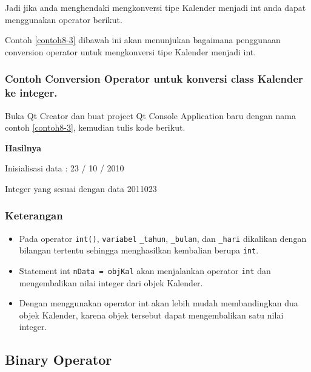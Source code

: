 

Jadi jika anda menghendaki mengkonversi tipe Kalender menjadi int anda
dapat menggunakan operator berikut.



Contoh \ref{contoh8-3} dibawah ini akan menunjukan bagaimana penggunaan conversion
operator untuk mengkonversi tipe Kalender menjadi int.

\subsubsection*{Contoh Conversion Operator untuk konversi class Kalender ke integer.}

Buka Qt Creator dan buat project Qt Console Application baru dengan nama
contoh \ref{contoh8-3}, kemudian tulis kode berikut.





\textbf{Hasilnya}
\begin{lcverbatim}
Inisialisasi data :
23 / 10 / 2010

Integer yang sesuai dengan data 2011023
\end{lcverbatim}


\subsubsection*{Keterangan}

\begin{itemize}

\item
  Pada operator \texttt{int()}, \texttt{variabel} \texttt{\_tahun},
  \texttt{\_bulan}, dan \texttt{\_hari} dikalikan dengan bilangan
  tertentu sehingga menghasilkan kembalian berupa \texttt{int}.
\item
  Statement int \texttt{nData\ =\ objKal} akan menjalankan operator
  \texttt{int} dan mengembalikan nilai integer dari objek Kalender.
\item
  Dengan menggunakan operator int akan lebih mudah membandingkan dua
  objek Kalender, karena objek tersebut dapat mengembalikan satu nilai
  integer.
\end{itemize}

\subsection{Binary Operator}\label{binary-operator}

